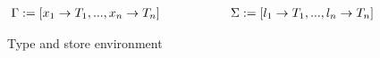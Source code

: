 \begin{figure}[H]
		\small
		\begin{minipage}[t]{.55\columnwidth}
			\[\begin{array}{@{}r@{\ \ }l@{\quad}l}
				\Gamma := [x_1 \rightarrow T_1, ..., x_n \rightarrow T_n]
				\hspace{2cm} \Sigma := [l_1 \rightarrow T_1, ..., l_n \rightarrow T_n]				
			\end{array}\]
		\end{minipage}%
		
	\caption{Type and store environment}\label{fig:type-store}
\end{figure}




